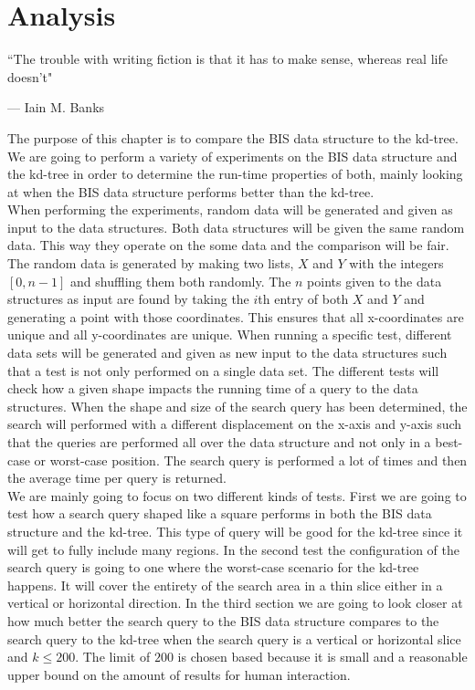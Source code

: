 \chapter{Analysis}
\label{ch:analysis}
\epigraph{``The trouble with writing fiction is that it has to make sense, whereas real life doesn't"}{--- \textup{Iain M. Banks}}

The purpose of this chapter is to compare the BIS data structure to the kd-tree. We are going to perform a variety of experiments on the BIS data structure and the kd-tree in order to determine the run-time properties of both, mainly looking at when the BIS data structure performs better than the kd-tree. \\


When performing the experiments, random data will be generated and given as input to the data structures. Both data structures will be given the same random data. This way they operate on the some data and the comparison will be fair. The random data is generated by making two lists, $X$ and $Y$ with the integers $[0,n-1]$ and shuffling them both randomly. The $n$ points given to the data structures as input are found by taking the $i$th entry of both $X$ and $Y$ and generating a point with those coordinates. This ensures that all x-coordinates are unique and all y-coordinates are unique. When running a specific test, different data sets will be generated and given as new input to the data structures such that a test is not only performed on a single data set. The different tests will check how a given shape impacts the running time of a query to the data structures. When the shape and size of the search query has been determined, the search will performed with a different displacement on the x-axis and y-axis such that the queries are performed all over the data structure and not only in a best-case or worst-case position. The search query is performed a lot of times and then the average time per query is returned. \\

We are mainly going to focus on two different kinds of tests. First we are going to test how a search query shaped like a square performs in both the BIS data structure and the kd-tree. This type of query will be good for the kd-tree since it will get to fully include many regions. In the second test the configuration of the search query is going to one where the worst-case scenario for the kd-tree happens. It will cover the entirety of the search area in a thin slice either in a vertical or horizontal direction. In the third section we are going to look closer at how much better the search query to the BIS data structure compares to the search query to the kd-tree when the search query is a vertical or horizontal slice and $k \leq 200$. The limit of $200$ is chosen based because it is small and a reasonable upper bound on the amount of results for human interaction.\\

